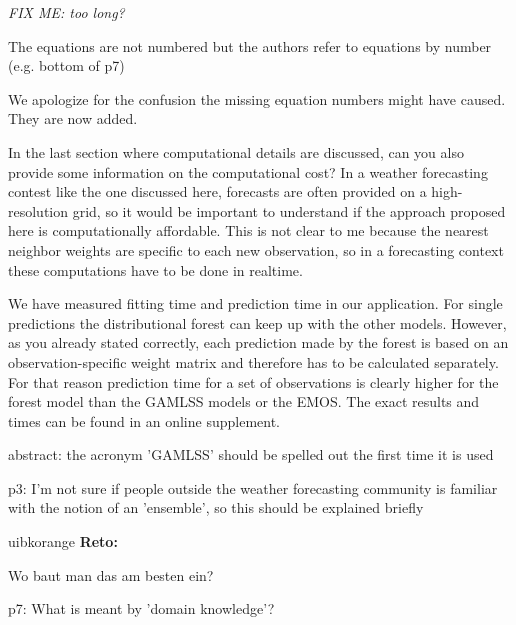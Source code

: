 \documentclass[american,foldmarks=false,noconfig]{uibklttr}
\newenvironment{review}{\fontshape{\itdefault}\fontseries{\bfdefault} \selectfont \smallskip}{\par}
\newenvironment{reto}{
    \begin{color}{uibkorange}
    \textbf{Reto:~}
        \itshape
}{
    \end{color}
}
\begin{document}
\textit{FIX ME: too long?}


\begin{review}
The equations are not numbered but the authors refer to equations 
by number (e.g. bottom of p7)
\end{review}

We apologize for the confusion the missing equation numbers 
might have caused. They are now added.

\begin{review}
In the last section where computational details are discussed, 
can you also provide some information on the computational cost? 
In a weather forecasting contest like the one discussed here, 
forecasts are often provided on a high-resolution grid, 
so it would be important to understand if the approach 
proposed here is computationally affordable. This is not clear 
to me because the nearest neighbor weights are specific 
to each new observation, so in a forecasting context these 
computations have to be done in realtime.
\end{review}

We have measured fitting time and prediction time in our 
application. For single predictions the distributional forest 
can keep up with the other models. However, as you already 
stated correctly, each prediction made by the forest is based 
on an observation-specific weight matrix and therefore has to 
be calculated separately. For that reason prediction time for a 
set of observations is clearly higher for the forest model than 
the GAMLSS models or the EMOS. The exact results and times can 
be found in an online supplement.


\begin{review}
abstract: the acronym 'GAMLSS' should be spelled out the first 
time it is used
\end{review}

\begin{review}
p3: I'm not sure if people outside the weather forecasting 
community is familiar with the notion of an 'ensemble', so 
this should be explained briefly
\end{review}

\begin{reto}
Wo baut man das am besten ein?
\end{reto}


\begin{review}
p7: What is meant by 'domain knowledge'?
\end{review}
\end{document}

